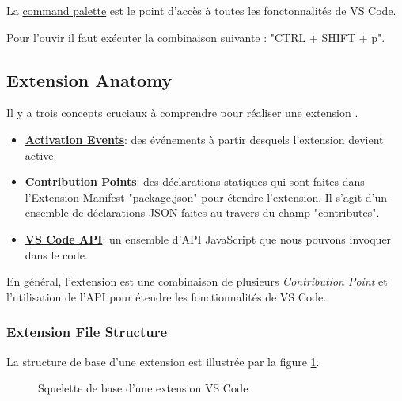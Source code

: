 \documentclass[
    iict, %
    il, %
]{heig-tb}
\begin{document}
La \href{https://code.visualstudio.com/docs/getstarted/userinterface#_command-palette}{command palette}
est le point d'accès à toutes les fonctonnalités de VS Code.

Pour l'ouvir il faut exécuter la combinaison suivante : "CTRL + SHIFT + p".

\subsection{Extension Anatomy}
Il y a trois concepts cruciaux à comprendre pour réaliser une extension \cite{extension-anatomy} .

\begin{itemize}
    \item \href{https://code.visualstudio.com/api/references/activation-events}{\textbf{Activation Events}}: des événements à partir desquels l'extension devient active.
    \item \href{https://code.visualstudio.com/api/references/contribution-points}{\textbf{Contribution Points}}: des déclarations statiques qui sont faites dans l'Extension Manifest "package.json" pour étendre l'extension. Il s'agit d'un ensemble de déclarations JSON faites au travers du champ "contributes".
    \item \href{https://code.visualstudio.com/api/references/vscode-api}{\textbf{VS Code API}}: un ensemble d'API JavaScript que nous pouvons invoquer dans le code.
\end{itemize}

En général, l'extension est une combinaison de plusieurs \emph{Contribution Point} et l'utilisation de l'API pour étendre les fonctionnalités de VS Code.

\subsubsection{Extension File Structure}\label{Extension File Structure}

La structure de base d'une extension est illustrée par la figure \ref{Squelette de base d'une extension VS Code}.

\begin{figure}[H] %
    \centering
    \caption[Squelette de base d'une extension VS Code]{\label{Squelette de base d'une extension VS Code} Squelette de base d'une extension VS Code}
\end{figure}
\end{document}
